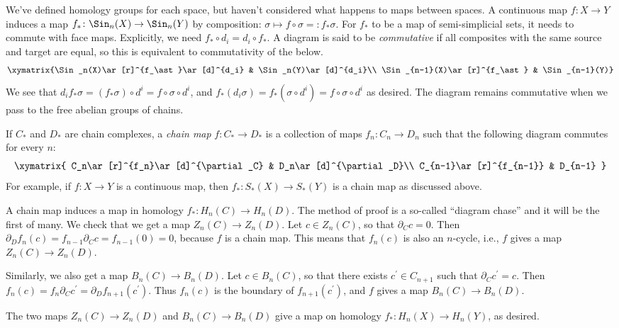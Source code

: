 We've defined homology groups for each space, but haven't considered what happens to maps between spaces. A continuous map $f\colon X\to Y$ induces a map $f_\ast\colon \Sin_n(X)\to\Sin_n(Y)$ by composition: $\sigma\mapsto f\circ \sigma=:f_\ast\sigma$. For $f_\ast$ to be a map of semi-simplicial sets, it needs to commute with face maps. Explicitly, we need $f_\ast \circ d_i = d_i \circ f_\ast$. A diagram is said to be \emph{commutative} if all composites with the same source and target are equal, so this is equivalent to commutativity of the below.
\begin{eqnarray*}
\xymatrix{\Sin_n(X)\ar[r]^{f_\ast}\ar[d]^{d_i} & \Sin_n(Y)\ar[d]^{d_i}\\
\Sin_{n-1}(X)\ar[r]^{f_\ast} & \Sin_{n-1}(Y)}
\end{eqnarray*}
We see that $d_if_\ast\sigma=(f_\ast\sigma)\circ d^i=f\circ\sigma\circ d^i$, and $f_\ast(d_i\sigma)=f_\ast(\sigma\circ d^i)=f\circ\sigma\circ d^i$ as desired. The diagram remains commutative when we pass to the free abelian groups of chains.

If $C_\ast$ and $D_\ast$ are chain complexes, a \emph{chain map} $f\colon C_\ast\to D_\ast$ is a collection of maps $f_n\colon C_n\to D_n$ such that the following diagram commutes for every $n$:
\begin{equation*}
    \xymatrix{
	C_n\ar[r]^{f_n}\ar[d]^{\partial_C} & D_n\ar[d]^{\partial_D}\\
	C_{n-1}\ar[r]^{f_{n-1}} & D_{n-1}
    }
\end{equation*}
For example, if $f\colon X\to Y$ is a continuous map, then $f_\ast \colon S_\ast(X)\to S_\ast(Y)$ is a chain map as discussed above.

A chain map induces a map in homology $f_\ast: H_n(C)\to H_n(D)$. The method of proof is a so-called ``diagram chase'' and it will be the first of many. We check that we get a map $Z_n(C)\to Z_n(D)$. Let $c\in Z_n(C)$, so that $\partial_C c = 0$. Then $\partial_D f_n(c) = f_{n-1}\partial_C c = f_{n-1}(0) = 0$, because $f$ is a chain map. This means that $f_n(c)$ is also an $n$-cycle, i.e., $f$ gives a map $Z_n(C)\to Z_n(D)$.

Similarly, we also get a map $B_n(C)\to B_n(D)$. Let $c\in B_n(C)$, so that there exists $c^\prime \in C_{n+1}$ such that $\partial_C c^\prime = c$. Then $f_n(c) = f_n\partial_C c^\prime = \partial_D f_{n+1}(c^\prime)$. Thus $f_n(c)$ is the boundary of $f_{n+1}(c^\prime)$, and $f$ gives a map $B_n(C)\to B_n(D)$.

The two maps $Z_n(C)\to Z_n(D)$ and $B_n(C)\to B_n(D)$ give a map on homology $f_\ast: H_n(X)\to H_n(Y)$, as desired.